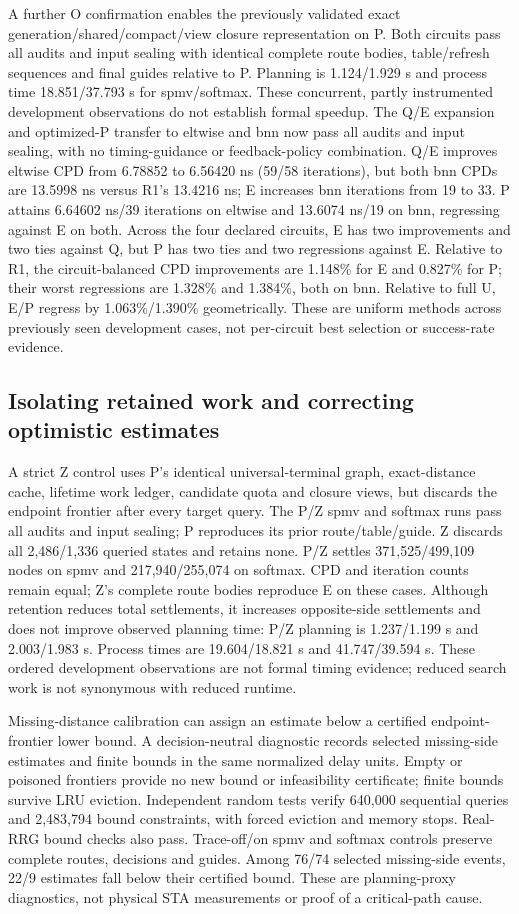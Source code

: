 \documentclass[conference,10pt]{IEEEtran}
\begin{document}
A further O confirmation enables the previously validated exact generation/shared/compact/view closure representation on P. Both circuits pass all audits and input sealing with identical complete route bodies, table/refresh sequences and final guides relative to P. Planning is 1.124/1.929 s and process time 18.851/37.793 s for spmv/softmax. These concurrent, partly instrumented development observations do not establish formal speedup. The Q/E expansion and optimized-P transfer to eltwise and bnn now pass all audits and input sealing, with no timing-guidance or feedback-policy combination. Q/E improves eltwise CPD from 6.78852 to 6.56420 ns (59/58 iterations), but both bnn CPDs are 13.5998 ns versus R1's 13.4216 ns; E increases bnn iterations from 19 to 33. P attains 6.64602 ns/39 iterations on eltwise and 13.6074 ns/19 on bnn, regressing against E on both. Across the four declared circuits, E has two improvements and two ties against Q, but P has two ties and two regressions against E. Relative to R1, the circuit-balanced CPD improvements are 1.148\% for E and 0.827\% for P; their worst regressions are 1.328\% and 1.384\%, both on bnn. Relative to full U, E/P regress by 1.063\%/1.390\% geometrically. These are uniform methods across previously seen development cases, not per-circuit best selection or success-rate evidence.

\subsection{Isolating retained work and correcting optimistic estimates}
A strict Z control uses P's identical universal-terminal graph, exact-distance cache, lifetime work ledger, candidate quota and closure views, but discards the endpoint frontier after every target query. The P/Z spmv and softmax runs pass all audits and input sealing; P reproduces its prior route/table/guide. Z discards all 2,486/1,336 queried states and retains none. P/Z settles 371,525/499,109 nodes on spmv and 217,940/255,074 on softmax. CPD and iteration counts remain equal; Z's complete route bodies reproduce E on these cases. Although retention reduces total settlements, it increases opposite-side settlements and does not improve observed planning time: P/Z planning is 1.237/1.199 s and 2.003/1.983 s. Process times are 19.604/18.821 s and 41.747/39.594 s. These ordered development observations are not formal timing evidence; reduced search work is not synonymous with reduced runtime.

Missing-distance calibration can assign an estimate below a certified endpoint-frontier lower bound. A decision-neutral diagnostic records selected missing-side estimates and finite bounds in the same normalized delay units. Empty or poisoned frontiers provide no new bound or infeasibility certificate; finite bounds survive LRU eviction. Independent random tests verify 640,000 sequential queries and 2,483,794 bound constraints, with forced eviction and memory stops. Real-RRG bound checks also pass. Trace-off/on spmv and softmax controls preserve complete routes, decisions and guides. Among 76/74 selected missing-side events, 22/9 estimates fall below their certified bound. These are planning-proxy diagnostics, not physical STA measurements or proof of a critical-path cause.
\end{document}
